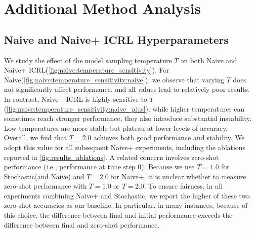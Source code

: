 \documentclass{article}
\theoremstyle{plain}
\theoremstyle{definition}
\theoremstyle{remark}
\newcommand{\naiveplus}{Naive+ ICRL\xspace}
\newcommand{\naiveshort}{Naive\xspace}
\newcommand{\naiveplusshort}{Naive+\xspace}
\newcommand{\expshort}{Stochastic\xspace}
\begin{document}
\section{Additional Method Analysis}\label{appendix:icrl}
\subsection{\naiveshort and \naiveplus Hyperparameters}
We study the effect of the model sampling temperature $T$ on both \naiveshort and \naiveplus (\autoref{fig:naive:temperature_sensitivity}). For \naiveshort (\autoref{fig:naive:temperature_sensitivity:naive}), we observe that varying $T$ does not significantly affect performance, and all values lead to relatively poor results.
In contrast, \naiveplus is highly sensitive to $T$ (\autoref{fig:naive:temperature_sensitivity:naive_plus}): while higher temperatures can sometimes reach stronger performance, they also introduce substantial instability.
Low temperatures are more stable but plateau at lower levels of accuracy. Overall, we find that $T=2.0$ achieves both good performance and stability.
We adopt this value for all subsequent \naiveplusshort experiments, including the ablations reported in \autoref{fig:results_ablations}.
A related concern involves zero-shot performance (i.e., performance at time step 0). Because we use $T=1.0$ for \expshort (and \naiveshort) and $T=2.0$ for \naiveplusshort, it is unclear whether to measure zero-shot performance with $T=1.0$ or $T=2.0$. To ensure fairness, in all experiments combining \naiveplusshort and \expshort, we report the higher of these two zero-shot accuracies as our baseline. In particular, in many instances, because of this choice, the difference between final and initial performance exceeds the difference between final and zero-shot performance.
\end{document}
